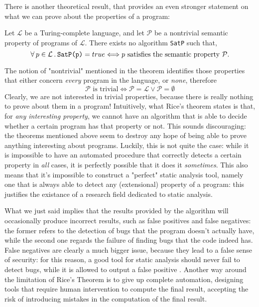 \documentclass[12pt,a4paper]{book}
\newcommand{\st}{\hspace{2px}.\hspace{2px}}
\theoremstyle{definition}
\begin{document}
	There is another theoretical result, that provides an even stronger statement on what we can prove about the properties of a program:
	\begin{thm} Let $\mathcal{L}$ be a Turing-complete language, and let $\mathcal{P}$ be a nontrivial semantic property of programs of $\mathcal{L}$. There exists no algorithm \texttt{SatP} such that,
		\[
		\forall\hspace{2px}p\in\mathcal{L}\st\texttt{SatP(p)} = true \Longleftrightarrow p\text{ satisfies the semantic property } \mathcal{P}. 	
		\]
	\end{thm}
	The notion of "nontrivial" mentioned in the theorem identifies those properties that either concern \textit{every} program in the language, or \textit{none}, therefore
	\[
	\mathcal{P}\text{ is trivial} \Longleftrightarrow \mathcal{P} = \mathcal{L} \vee \mathcal{P} = \emptyset
	\]
	Clearly, we are not interested in trivial properties, because there is really nothing to prove about them in a program!
	Intuitively, what Rice's theorem states is that, for \textit{any interesting property}, we cannot have an algorithm that is able to decide whether a certain program has that property or not. This sounds discouraging: the theorems mentioned above seem to destroy any hope of being able to prove anything interesting about programs. Luckily, this is not quite the case: while it is impossible to have an automated procedure that correctly detects a certain property in \textit{all} cases, it is perfectly possible that it does it \textit{sometimes}. This also means that it's impossible to construct a "perfect" static analysis tool, namely one that is always able to detect any (extensional) property of a program: this justifies the existance of a research field dedicated to static analysis.
	
	What we just said implies that the results provided by the algorithm will occasionally produce incorrect results, such as false positives and false negatives: the former refers to the detection of bugs that the program doesn't actually have, while the second one regards the failure of finding bugs that the code indeed has. False negatives are clearly a much bigger issue, because they lead to a false sense of security: for this reason, a good tool for static analysis should never fail to detect bugs, while it is allowed to output a false positive \cite{Gomes2009}. Another way around the limitation of Rice's Theorem is to give up complete automation, designing tools that require human intervention to compute the final result, accepting the risk of introducing mistakes in the computation of the final result.
	
\end{document}
